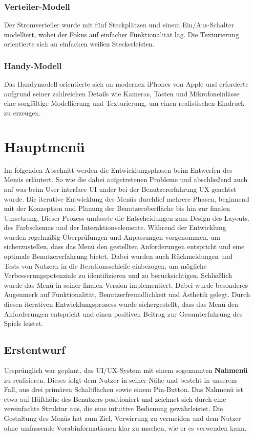 \subsubsection*{Verteiler-Modell}
Der Stromverteiler wurde mit fünf Steckplätzen und einem Ein/Aus-Schalter modelliert, wobei der Fokus auf einfacher
Funktionalität lag. Die Texturierung orientierte sich an einfachen weißen Steckerleisten.

\subsubsection*{Handy-Modell}
Das Handymodell orientierte sich an modernen iPhones von Apple und erforderte aufgrund seiner zahlreichen Details wie
Kameras, Tasten und Mikrofoneinlässe eine sorgfältige Modellierung und Texturierung, um einen realistischen Eindruck zu erzeugen.


\section{Hauptmenü}
Im folgenden Abschnitt werden die Entwicklungsphasen beim Entwerfen des Menüs erläutert. So wie die dabei aufgetretenen
Probleme und abschließend auch auf was beim User interface UI under bei der Benutzererfahrung UX geachtet wurde.
Die iterative Entwicklung des Menüs durchlief mehrere Phasen, beginnend mit der Konzeption und Planung der
Benutzeroberfläche bis hin zur finalen Umsetzung. Dieser Prozess umfasste die Entscheidungen zum Design des Layouts, des
Farbschemas und der Interaktionselemente. Während der Entwicklung wurden regelmäßig Überprüfungen und Anpassungen
vorgenommen, um sicherzustellen, dass das Menü den gestellten Anforderungen entspricht und eine optimale Benutzererfahrung
bietet. Dabei wurden auch Rückmeldungen und Tests von Nutzern in die Iterationsschleife einbezogen, um mögliche
Verbesserungspotenziale zu identifizieren und zu berücksichtigen.
Schließlich wurde das Menü in seiner finalen Version implementiert. Dabei wurde besonderes Augenmerk auf Funktionalität,
Benutzerfreundlichkeit und Ästhetik gelegt. Durch diesen iterativen Entwicklungsprozess wurde sichergestellt, dass das
Menü den Anforderungen entspricht und einen positiven Beitrag zur Gesamterfahrung des Spiels leistet.

\subsection{Erstentwurf}
Ursprünglich war geplant, das UI/UX-System mit einem sogenannten \textbf{Nahmenü} zu realisieren. Dieses folgt dem
Nutzer in seiner Nähe und besteht in unserem Fall, aus drei primären Schaltflächen sowie einem Pin-Button. Das Nahmenü
ist etwa auf Hüfthöhe des Benutzers positioniert und zeichnet sich durch eine vereinfachte Struktur aus, die eine
intuitive Bedienung gewährleistet. Die Gestaltung des Menüs hat zum Ziel, Verwirrung zu vermeiden und dem Nutzer ohne
umfassende Vorabinformationen klar zu machen, wie er es verwenden kann.

